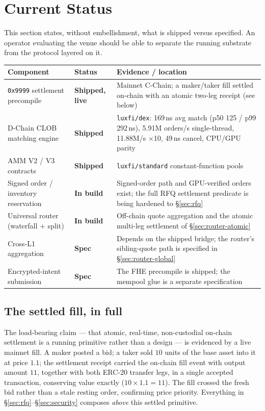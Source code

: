 \section{Current Status}
\label{sec:status}

This section states, without embellishment, what is shipped versus
specified. An operator evaluating the venue should be able to separate the
running substrate from the protocol layered on it.

\begin{center}
\small
\begin{tabular}{@{}lll@{}}
\toprule
\textbf{Component} & \textbf{Status} & \textbf{Evidence / location}\\
\midrule
\texttt{0x9999} settlement precompile & \textbf{Shipped, live} & Mainnet C-Chain; a maker/taker fill settled on-chain with an atomic two-leg receipt (see below)\\
D-Chain CLOB matching engine & \textbf{Shipped} & \texttt{luxfi/dex}: 169\,ns avg match (p50 125 / p99 292\,ns), 5.91M orders/s single-thread, 11.88M/s $\times$10, 49\,ns cancel, CPU/GPU parity\\
AMM V2 / V3 contracts & \textbf{Shipped} & \texttt{luxfi/standard} constant-function pools\\
Signed order / inventory reservation & \textbf{In build} & Signed-order path and GPU-verified orders exist; the full RFQ settlement predicate is being hardened to \S\ref{sec:rfq}\\
Universal router (waterfall + split) & \textbf{In build} & Off-chain quote aggregation and the atomic multi-leg settlement of \S\ref{sec:router-atomic}\\
Cross-L1 aggregation & \textbf{Spec} & Depends on the shipped bridge; the router's sibling-quote path is specified in \S\ref{sec:router-global}\\
Encrypted-intent submission & \textbf{Spec} & The FHE precompile is shipped; the mempool glue is a separate specification\\
\bottomrule
\end{tabular}
\end{center}

\subsection{The settled fill, in full}

The load-bearing claim --- that atomic, real-time, non-custodial on-chain
settlement is a running primitive rather than a design --- is evidenced by a
live mainnet fill. A maker posted a bid; a taker sold $10$ units of the base
asset into it at price $1.1$; the settlement receipt carried the on-chain
fill event with output amount $11$, together with both ERC-20 transfer legs,
in a single accepted transaction, conserving value exactly ($10 \times 1.1 =
11$). The fill crossed the fresh bid rather than a stale resting order,
confirming price priority. Everything in \S\ref{sec:rfq}--\S\ref{sec:security}
composes \emph{above} this settled primitive.

